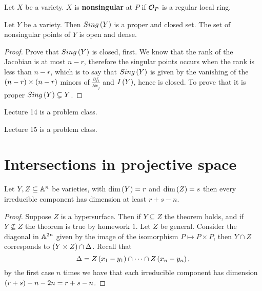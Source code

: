 \begin{definition}
Let $ X $ be a variety. $ X $ is \textbf{nonsingular} at $ P $ if $ \mathcal{O}_P $ is a regular local ring.
\end{definition}

\begin{theorem}
Let $ Y $ be a variety. Then $ Sing\left( Y \right) $ is a proper and closed set. The set of nonsingular points of $ Y $ is open and dense.
\end{theorem}

\begin{proof}
Prove that $ Sing\left( Y \right) $ is closed, first. We know that the rank of the Jacobian is at most $ n - r $, therefore the singular points occurs when the rank is less than $ n - r $, which is to say that $ Sing\left( Y \right) $ is given by the vanishing of the $ \left( n - r \right) \times \left( n - r \right) $ minors of $ \tfrac{\partial f_i}{\partial x_j} $ and $ I\left( Y \right) $, hence is closed. To prove that it is proper $ Sing\left( Y \right) \subsetneq Y $.
\end{proof}


Lecture 14 is a problem class.


Lecture 15 is a problem class.

\pagebreak

\section{Intersections in projective space}


\begin{theorem}
Let $ Y, Z \subseteq \mathbb{A}^n $ be varieties, with $ \dim\left( Y \right) = r $ and $ \dim\left( Z \right) = s $ then every irreducible component has dimension at least $ r + s - n $.
\end{theorem}

\begin{proof}
Suppose $ Z $ is a hypersurface. Then if $ Y \subseteq Z $ the theorem holds, and if $ Y \nsubseteq Z $ the theorem is true by homework $ 1 $. Let $ Z $ be general. Consider the diagonal in $ \mathbb{A}^{2n} $ given by the image of the isomorphism $ P \mapsto P \times P $, then $ Y \cap Z $ corresponds to $ \left( Y \times Z \right) \cap \Delta $. Recall that
$$ \Delta = Z\left( x_1 - y_1 \right) \cap \dots \cap Z\left( x_n - y_n \right), $$
by the first case $ n $ times we have that each irreducible component has dimension $ \left( r + s \right) - n - 2n = r + s - n $.
\end{proof}

